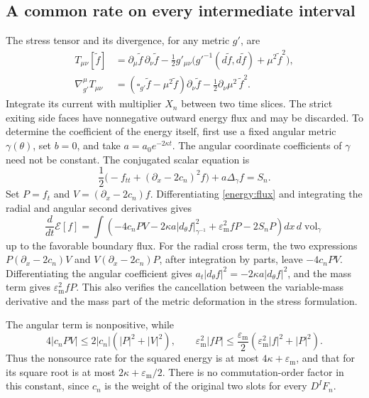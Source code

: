 \subsection{A common rate on every intermediate interval}

The stress tensor and its divergence, for any metric \(g'\), are
\[
 \begin{split}
 T_{\mu\nu}[\widetilde f]
  &=\partial_\mu\widetilde f\,\partial_\nu\widetilde f
    -\frac12g'_{\mu\nu}
       \bigl(g'^{-1}(d\widetilde f,d\widetilde f)
                    +\mu^2\widetilde f^2\bigr),\\
 \nabla_{g'}^\mu T_{\mu\nu}
  &=(\square_{g'}\widetilde f-\mu^2\widetilde f)
                              \partial_\nu\widetilde f
       -\frac12\partial_\nu\mu^2\,\widetilde f^2.
 \end{split}
\]
Integrate its current with multiplier \(X_n\) between two time
slices. The strict exiting side faces have nonnegative outward energy
flux and may be discarded. To determine the coefficient of the energy
itself, first use a fixed angular metric \(\gamma(\theta)\), set
\(b=0\), and take \(a=a_0e^{-2\kappa t}\). The angular coordinate
coefficients of \(\gamma\) need not be constant. The conjugated
scalar equation is
\[
 \frac12\bigl(-f_{tt}+(\partial_x-2c_n)^2f\bigr)
                +a\Delta_\gamma f=S_n.
\]
Set \(P=f_t\) and \(V=(\partial_x-2c_n)f\). Differentiating
\eqref{energy:flux} and integrating the radial and angular second
derivatives gives
\begin{equation}\label{energy:model-identity}
 \frac{d}{dt}\mathcal E[f]
  =\int\left(-4c_nPV
       -2\kappa a|d_\theta f|_{\gamma^{-1}}^2
       +\varepsilon_{\mathrm m}^2fP-2S_nP\right)
                              dx\,d\operatorname{vol}_\gamma
\end{equation}
up to the favorable boundary flux. For the radial cross term, the two
expressions \(P(\partial_x-2c_n)V\) and
\(V(\partial_x-2c_n)P\), after integration by parts, leave
\(-4c_nPV\). Differentiating the angular coefficient gives
\(a_t|d_\theta f|^2=-2\kappa a|d_\theta f|^2\), and the mass
term gives \(\varepsilon_{\mathrm m}^2fP\). This also verifies the cancellation
between the variable-mass derivative and the mass part of the metric
deformation in the stress formulation.

The angular term is nonpositive, while
\[
 4|c_nPV|\le2|c_n|(|P|^2+|V|^2),\qquad
 \varepsilon_{\mathrm m}^2|fP|
       \le\frac{\varepsilon_{\mathrm m}}{2}
                         (\varepsilon_{\mathrm m}^2|f|^2+|P|^2).
\]
Thus the nonsource rate for the squared energy is at most
\(4\kappa+\varepsilon_{\mathrm m}\), and that for its square root is at most
\(2\kappa+\varepsilon_{\mathrm m}/2\). There is no commutation-order factor
in this constant, since \(c_n\) is the weight of the original two
slots for every \(D^IF_n\).

